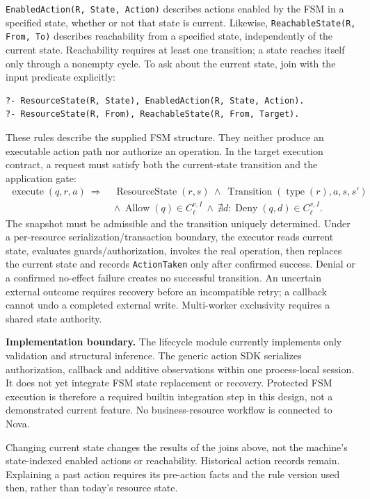 \documentclass[10pt]{article}
\begin{document}
\texttt{EnabledAction(R, State, Action)} describes actions enabled by the FSM in a
specified state, whether or not that state is current. Likewise,
\texttt{ReachableState(R, From, To)} describes reachability from a specified state,
independently of the current state. Reachability requires at least one transition;
a state reaches itself only through a nonempty cycle. To ask about the current state,
join with the input predicate explicitly:
\begin{lstlisting}
?- ResourceState(R, State), EnabledAction(R, State, Action).
?- ResourceState(R, From), ReachableState(R, From, Target).
\end{lstlisting}

These rules describe the supplied FSM structure. They neither produce an executable
action path nor authorize an operation. In the target execution contract, a request
must satisfy both the current-state transition and the application gate:
\[
\begin{split}
\operatorname{execute}(q,r,a)\ \Longrightarrow\;&
 \operatorname{ResourceState}(r,s)\ \land\
 \operatorname{Transition}(\operatorname{type}(r),a,s,s')\\
 &\land\ \operatorname{Allow}(q)\in C_\ell^{v,I}
 \ \land\ \nexists d:\operatorname{Deny}(q,d)\in C_\ell^{v,I}.
\end{split}
\]
The snapshot must be admissible and the transition uniquely determined. Under a
per-resource serialization/transaction boundary, the executor reads current state,
evaluates guards/authorization, invokes the real operation, then replaces the current
state and records \texttt{ActionTaken} only after confirmed success. Denial or a
confirmed no-effect failure creates no successful transition. An uncertain external
outcome requires recovery before an incompatible retry; a callback cannot undo a
completed external write. Multi-worker exclusivity requires a shared state authority.

\textbf{Implementation boundary.} The lifecycle module currently implements only
validation and structural inference. The generic action SDK serializes authorization,
callback and additive observations within one process-local session. It does not yet
integrate FSM state replacement or recovery. Protected FSM execution is therefore a
required builtin integration step in this design, not a demonstrated current feature.
No business-resource workflow is connected to Nova.

Changing current state changes the results of the joins above, not the machine's
state-indexed enabled actions or reachability. Historical action records remain.
Explaining a past action requires its pre-action facts and the rule version used then,
rather than today's resource state.
\end{document}
